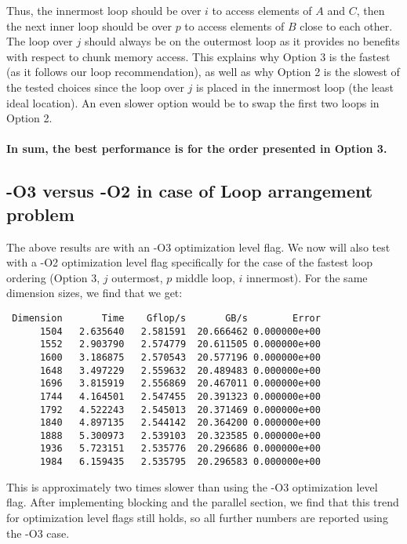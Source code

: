 \documentclass[10pt, letterpaper]{article}
\begin{document}
Thus, the innermost loop should be over $i$ to access elements of $A$ and $C$, then the next inner loop should be over $p$ to access elements of $B$ close to each other. The loop over $j$ should always be on the outermost loop as it provides no benefits with respect to chunk memory access. This explains why Option 3 is the fastest (as it follows our loop recommendation), as well as why Option 2 is the slowest of the tested choices since the loop over $j$ is placed in the innermost loop (the least ideal location). An even slower option would be to swap the first two loops in Option 2.\\\\
\textbf{In sum, the best performance is for the order presented in Option 3.}
\subsection{-O3 versus -O2 in case of Loop arrangement problem}
The above results are with an -O3 optimization level flag. We now will also test with a -O2 optimization level flag specifically for the case of the fastest loop ordering (Option 3, $j$ outermost, $p$ middle loop, $i$ innermost). For the same dimension sizes, we find that we get:
\begin{verbatim}
 Dimension       Time    Gflop/s       GB/s        Error
      1504   2.635640   2.581591  20.666462 0.000000e+00
      1552   2.903790   2.574779  20.611505 0.000000e+00
      1600   3.186875   2.570543  20.577196 0.000000e+00
      1648   3.497229   2.559632  20.489483 0.000000e+00
      1696   3.815919   2.556869  20.467011 0.000000e+00
      1744   4.164501   2.547455  20.391323 0.000000e+00
      1792   4.522243   2.545013  20.371469 0.000000e+00
      1840   4.897135   2.544142  20.364200 0.000000e+00
      1888   5.300973   2.539103  20.323585 0.000000e+00
      1936   5.723151   2.535776  20.296686 0.000000e+00
      1984   6.159435   2.535795  20.296583 0.000000e+00
\end{verbatim}
This is approximately two times slower than using the -O3 optimization level flag. After implementing blocking and the parallel section, we find that this trend for optimization level flags still holds, so all further numbers are reported using the -O3 case.
\end{document}

